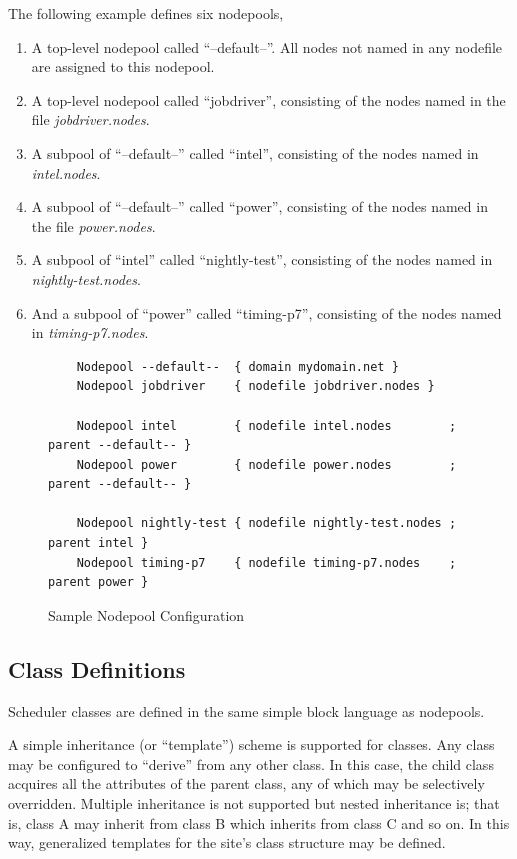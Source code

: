     The following example defines six nodepools, 
    \begin{enumerate}
      \item A top-level nodepool called ``--default--''.  All nodes not named
        in any nodefile are assigned to this nodepool.
      \item A top-level nodepool called ``jobdriver'', consisting of the nodes
        named in the file {\em jobdriver.nodes}.
      \item A subpool of ``--default--'' called ``intel'', consisting of the
        nodes named in {\em intel.nodes}.
      \item A subpool of ``--default--'' called ``power'', consisting of the
        nodes named in the file {\em power.nodes}.
      \item A subpool of ``intel'' called ``nightly-test'', consisting of the 
        nodes named in {\em nightly-test.nodes}.
      \item And a subpool of ``power'' called ``timing-p7'', consisting of the
        nodes named in {\em timing-p7.nodes}.
    \end{enumerate}

    \begin{figure}[H]
    
\begin{verbatim}
    Nodepool --default--  { domain mydomain.net }
    Nodepool jobdriver    { nodefile jobdriver.nodes }
    
    Nodepool intel        { nodefile intel.nodes        ; parent --default-- }
    Nodepool power        { nodefile power.nodes        ; parent --default-- }

    Nodepool nightly-test { nodefile nightly-test.nodes ; parent intel }
    Nodepool timing-p7    { nodefile timing-p7.nodes    ; parent power }
\end{verbatim}
      \caption{Sample Nodepool Configuration}
      \label{fig:nodepool.configuration}

    \end{figure}    


    \subsection{Class Definitions}
    \label{subsubsec:class.configuration}

    Scheduler classes are defined in the same simple block language as
    nodepools.

    A simple inheritance (or ``template'') scheme is supported for classes.  Any
    class may be configured to ``derive'' from any other class.  In this case, the
    child class acquires all the attributes of the parent class, any of which may
    be selectively overridden.  Multiple inheritance is not supported but
    nested inheritance is; that is, class A may inherit from class B which inherits
    from class C and so on. In this way, generalized templates for the site's
    class structure may be defined.  

